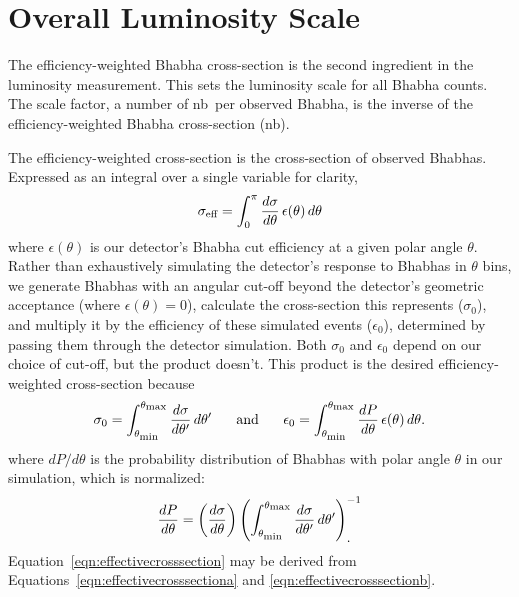 \documentclass{cornell}
\begin{document}
\section{Overall Luminosity Scale}

The efficiency-weighted Bhabha cross-section is the second ingredient
in the luminosity measurement.  This sets the luminosity scale for all
Bhabha counts.  The scale factor, a number of nb\inv\ per observed
Bhabha, is the inverse of the efficiency-weighted Bhabha cross-section
(nb).

The efficiency-weighted cross-section is the cross-section of observed
Bhabhas.  Expressed as an integral over a single variable for clarity,
\begin{equation}
  \sigma_{\mbox{\scriptsize eff}} = \int_0^\pi \frac{d\sigma}{d\theta} \,
  \epsilon(\theta) \, d\theta
  \label{eqn:effectivecrosssection}
\end{equation}
where $\epsilon(\theta)$ is our detector's Bhabha cut efficiency at a
given polar angle $\theta$.  Rather than exhaustively simulating the
detector's response to Bhabhas in $\theta$ bins, we generate Bhabhas
with an angular cut-off beyond the detector's geometric acceptance
(where $\epsilon(\theta) = 0$), calculate the cross-section
this represents ($\sigma_0$), and multiply it by the efficiency of
these simulated events ($\epsilon_0$), determined by passing them
through the detector simulation.  Both $\sigma_0$ and $\epsilon_0$
depend on our choice of cut-off, but the product doesn't.  This
product is the desired efficiency-weighted cross-section because
\begin{equation}
  \sigma_0 = \int_{\theta_{\mbox{\scriptsize min}}}^{\theta_{\mbox{\scriptsize max}}}
  \frac{d\sigma}{d\theta'} \, d\theta'
  \mbox{\hspace{0.5 cm} and \hspace{0.5 cm}}
  \epsilon_0 = \int_{\theta_{\mbox{\scriptsize min}}}^{\theta_{\mbox{\scriptsize max}}}
  \frac{dP}{d\theta} \, \epsilon(\theta) \, d\theta \mbox{.}
  \label{eqn:effectivecrosssectiona}
\end{equation}
where $dP/d\theta$ is the probability distribution of Bhabhas with
polar angle $\theta$ in our simulation, which is normalized:
\begin{equation}
  \frac{dP}{d\theta} = \left(\frac{d\sigma}{d\theta}\right) \left(
  \int_{\theta_{\mbox{\scriptsize min}}}^{\theta_{\mbox{\scriptsize max}}}
  \frac{d\sigma}{d\theta'} \, d\theta' \right)^{-1}_{\mbox{\normalsize .}}
  \label{eqn:effectivecrosssectionb}
\end{equation}
Equation~\ref{eqn:effectivecrosssection} may be derived from
Equations~\ref{eqn:effectivecrosssectiona} and \ref{eqn:effectivecrosssectionb}.
\end{document}
